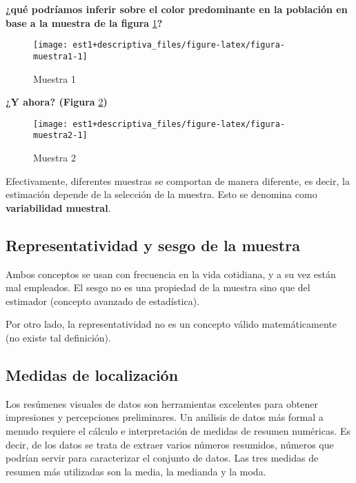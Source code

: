 \documentclass[
]{book}
\begin{document}
\textbf{¿qué podríamos inferir sobre el color predominante en la población en base a la muestra de la figura} \ref{fig:figura-muestra1}\textbf{?}

\begin{figure}

{\centering \texttt{[image: est1+descriptiva\_files/figure-latex/figura-muestra1-1]} 

}

\caption{Muestra 1}\label{fig:figura-muestra1}
\end{figure}

\textbf{¿Y ahora? (Figura} \ref{fig:figura-muestra2}\textbf{)}

\begin{figure}

{\centering \texttt{[image: est1+descriptiva\_files/figure-latex/figura-muestra2-1]} 

}

\caption{Muestra 2}\label{fig:figura-muestra2}
\end{figure}

Efectivamente, diferentes muestras se comportan de manera diferente, es decir, la estimación depende de la selección de la muestra. Esto se denomina como \textbf{variabilidad muestral}.

\hypertarget{representatividad-y-sesgo-de-la-muestra}{%
\subsection{Representatividad y sesgo de la muestra}\label{representatividad-y-sesgo-de-la-muestra}}

Ambos conceptos se usan con frecuencia en la vida cotidiana, y a su vez están mal empleados. El sesgo no es una propiedad de la muestra sino que del estimador (concepto avanzado de estadística).

Por otro lado, la representatividad no es un concepto válido matemáticamente (no existe tal definición).

\hypertarget{medidas-de-localizaciuxf3n}{%
\subsection{Medidas de localización}\label{medidas-de-localizaciuxf3n}}

Los resúmenes visuales de datos son herramientas excelentes para obtener impresiones y percepciones preliminares. Un análisis de datos más formal a menudo requiere el cálculo e interpretación de medidas de resumen numéricas. Es decir, de los datos se trata de extraer varios números resumidos, números que podrían servir para caracterizar el conjunto de datos. Las tres medidas de resumen más utilizadas son la media, la medianda y la moda.
\end{document}

